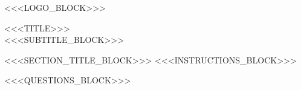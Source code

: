 \documentclass[11pt]{article}
\begin{document}
<<<LOGO_BLOCK>>>

\begin{center}
<<<TITLE>>>
\\%
<<<SUBTITLE_BLOCK>>>
\end{center}

\vspace{2em}

<<<SECTION_TITLE_BLOCK>>>
<<<INSTRUCTIONS_BLOCK>>>

\begin{enumerate}[label=Q\arabic*., leftmargin=*]
<<<QUESTIONS_BLOCK>>>
\end{enumerate}
\end{document}
